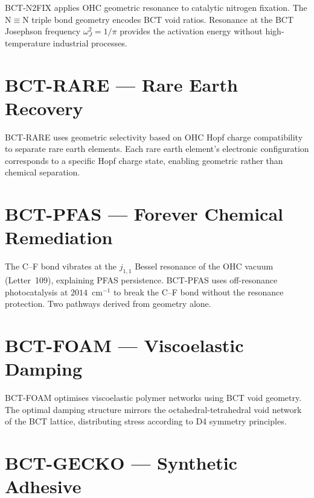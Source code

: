 \documentclass[aps,prl,twocolumn,showpacs,preprintnumbers]{revtex4-2}
\begin{document}
BCT-N2FIX applies OHC geometric resonance to catalytic nitrogen
fixation. The N$\equiv$N triple bond geometry encodes BCT void ratios.
Resonance at the BCT Josephson frequency $\omega_J^2 = 1/\pi$
provides the activation energy without high-temperature industrial
processes.

\section{BCT-RARE --- Rare Earth Recovery}

BCT-RARE uses geometric selectivity based on OHC Hopf charge
compatibility to separate rare earth elements. Each rare earth
element's electronic configuration corresponds to a specific Hopf
charge state, enabling geometric rather than chemical separation.

\section{BCT-PFAS --- Forever Chemical Remediation}

The C--F bond vibrates at the $j_{1,1}$ Bessel resonance of the
OHC vacuum (Letter~109), explaining PFAS persistence. BCT-PFAS
uses off-resonance photocatalysis at $2014$~cm$^{-1}$ to break
the C--F bond without the resonance protection. Two pathways
derived from geometry alone.

\section{BCT-FOAM --- Viscoelastic Damping}

BCT-FOAM optimises viscoelastic polymer networks using BCT void
geometry. The optimal damping structure mirrors the octahedral-tetrahedral
void network of the BCT lattice, distributing stress according to
D4 symmetry principles.

\section{BCT-GECKO --- Synthetic Adhesive}
\end{document}
